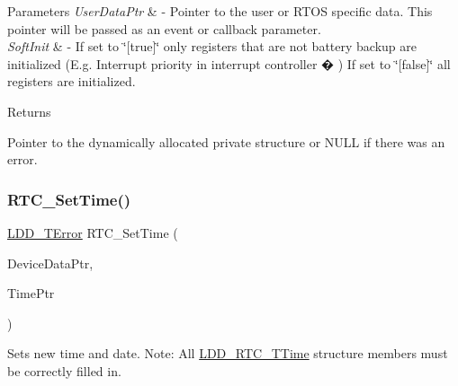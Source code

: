 \begin{DoxyParams}{Parameters}
{\em User\+Data\+Ptr} & -\/ Pointer to the user or R\+T\+OS specific data. This pointer will be passed as an event or callback parameter. \\
\hline
{\em Soft\+Init} & -\/ If set to \char`\"{}\mbox{[}true\mbox{]}\char`\"{} only registers that are not battery backup are initialized (E.\+g. Interrupt priority in interrupt controller � ) If set to \char`\"{}\mbox{[}false\mbox{]}\char`\"{} all registers are initialized. \\
\hline
\end{DoxyParams}
\begin{DoxyReturn}{Returns}

\begin{DoxyItemize}
\item Pointer to the dynamically allocated private structure or N\+U\+LL if there was an error. 
\end{DoxyItemize}
\end{DoxyReturn}
\mbox{\label{group___r_t_c__module_gaa23aacdc2ac44dbcb0b4efeb7e394b8b}} 
\subsubsection{\texorpdfstring{R\+T\+C\+\_\+\+Set\+Time()}{RTC\_SetTime()}}
{\footnotesize\ttfamily \hyperlink{group___p_e___types__module_ga24c2b045fd04e79e85f261ce4df35588}{L\+D\+D\+\_\+\+T\+Error} R\+T\+C\+\_\+\+Set\+Time (\begin{DoxyParamCaption}\item[{\hyperlink{group___p_e___types__module_gac5cf1362f1f0e3a2ce71b1bf2276d091}{L\+D\+D\+\_\+\+T\+Device\+Data} $\ast$}]{Device\+Data\+Ptr,  }\item[{\hyperlink{struct_l_d_d___r_t_c___t_time}{L\+D\+D\+\_\+\+R\+T\+C\+\_\+\+T\+Time} $\ast$}]{Time\+Ptr }\end{DoxyParamCaption})}



Sets new time and date. Note\+: All \hyperlink{struct_l_d_d___r_t_c___t_time}{L\+D\+D\+\_\+\+R\+T\+C\+\_\+\+T\+Time} structure members must be correctly filled in. 


